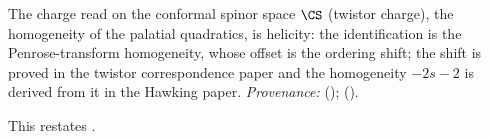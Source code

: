 The charge read on the conformal spinor space $\CS$ (twistor charge), the homogeneity of the palatial quadratics, is helicity: the identification is the Penrose-transform homogeneity, whose offset is the ordering shift; the shift is proved in the twistor correspondence paper and the homogeneity $-2s-2$ is derived from it in the Hawking paper. \emph{Provenance:} \cite[Thm.~5.7]{ButlerT9} (); \cite[Prop.~5.2]{ButlerT7} ().

This restates .
